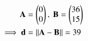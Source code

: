 \begin{align}
\vec{A}&=\myvec{0 \\ 0},\  
\Vec{B}=\myvec{36 \\ 15} \\ 
\implies 
\vec{d}&=\norm{\vec{A}-\vec{B}}
=39
\end{align}

